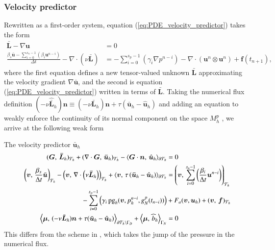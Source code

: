 \subsubsection{Velocity predictor}%
Rewritten as a first-order system, equation (\ref{eq:PDE_velocity_predictor}) takes the form
\begin{equation}
  \begin{aligned}
    \bar{\bm{L}} - \nabla \bm{u} &= 0  \\
    \frac{ \beta_s \bar{\bm{u}} - \sum_{i=0}^{s_u-1}\left(\beta_i \bm{u}^{n-i}\right) }{\Delta t} 
    - \nabla \cdot \left(\nu \bar{\bm{L}}\right) 
    &= - \sum_{i=0}^{s_p-1}\left(\gamma_i\nabla p^{n-i}\right) 
    - \nabla \cdot \left(\bm{u}^n\otimes \bm{u}^n\right) 
    + \bm{f}(t_{n+1}),
  \end{aligned}
  \label{eq:velocity_predictor_first_order}
\end{equation}
where the first equation defines a new tensor-valued unknown $\bar{\bm{L}}$ approximating the velocity gradient $\nabla\bar{\bm{u}}$, and the second is equation (\ref{eq:PDE_velocity_predictor}) written in terms of $\bar{\bm{L}}$.
Taking the numerical flux definition $\left(-\nu \hat{\bm{\bar{L}}}_h \right)\bm{n} \equiv \left(-\nu \bm{\bar{L}}_h\right)\bm{n} + \tau (\bm{\bar{u}}_h - \hat{\bm{u}}_h)$ and adding an equation to weakly enforce the continuity of its normal component on the space $M_h^p$ \cite{nguyen_hybridizable_2010,nguyen_implicit_2011}, we arrive at the following weak form

The velocity predictor $\bar{\bm{u}}_h$
\begin{equation}
  \begin{aligned}
    ( \bm{G} ,\, \bm{\bar{L}}_h)_{\mathcal{T}_h} 
    + ( \nabla \cdot \bm{G} ,\, \bm{\bar{u}}_h)_{\mathcal{T}_h} 
   - \langle \bm{G}\cdot\bm{n} ,\, \hat{\bm{u}}_h \rangle_{\partial \mathcal{T}_h} &=0 \\
   \left( \bm{v} ,\, \frac{\beta_s}{\Delta t} \bar{\bm{u}} \right)_{\mathcal{T}_h}
    - \left( \bm{v} ,\, \nabla \cdot  \left(\nu \bm{\bar{L}}_h\right) \right)_{\mathcal{T}_h}
    + \langle \bm{v} ,\, \tau \left(\bm{\bar{u}}_h - \hat{\bm{u}}_h\right) \rangle_{\partial \mathcal{T}_h}
    &= \left(\bm{v},\,  \sum_{i=0}^{s_u-1}\left(\frac{\beta_i}{\Delta t}  \bm{u}^{n-i}\right) \right)_{\mathcal{T}_h} \\
     - \sum_{i=0}^{s_p-1}\left(\gamma_i\,\text{pg}_h(\bm{v}, p_h^{n-i},g^p_N(t_{n-i}))\right) 
    &+ F_a(\bm{v},\bm{u}_h)
    + (\bm{v},\, \bm{f})_{\mathcal{T}_h} \\
    \left\langle \bm{\mu} ,\, (-\nu \bar{\bm{L}}_h)\bm{n} + \tau(\bar{\bm{u}}_h - \hat{\bm{u}}_h) \right\rangle_{\partial \mathcal{T}_h \setminus \Gamma_D} 
+ \left\langle \bm{\mu} ,\, \widehat{b}_h \right\rangle_{\Gamma_N} &= 0
  \end{aligned}
\end{equation}
This differs from the scheme in \cite{ueckermann_lermusiaux_JCP2016}, which takes the jump of the pressure in the numerical flux.

